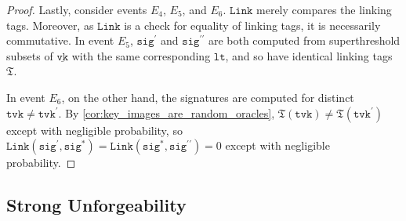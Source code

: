 \documentclass[11pt]{article}
\theoremstyle{definition}
\newcommand{\lt}{\texttt{lt}}
\newcommand{\tvk}{\texttt{tvk}}
\newcommand{\VK}{\underline{\texttt{vk}}}
\newcommand{\sig}{\texttt{sig}}
\newcommand{\link}{\texttt{Link}}
\begin{document}
\begin{proof}
Lastly, consider events $E_4$, $E_5$, and $E_6$. $\link$ merely compares the linking tags. Moreover, as $\link$ is a check for equality of linking tags, it is necessarily commutative.
In event $E_5$, $\sig^\prime$ and $\sig^{\prime \prime}$ are both computed from superthreshold subsets of $\VK$ with the same corresponding $\lt$, and so have identical linking tags $\mathfrak{T}$. 

In event $E_6$, on the other hand, the signatures are computed for distinct $\tvk \neq \tvk^\prime$. By  \cref{cor:key_images_are_random_oracles}, $\mathfrak{T}(\tvk) \neq \mathfrak{T}(\tvk^\prime)$ except with negligible probability, so $\link(\sig^\prime, \sig^*) = \link(\sig^*, \sig^{\prime \prime}) = 0$ except with negligible probability.\end{proof}


\subsection{Strong Unforgeability}
\end{document}
